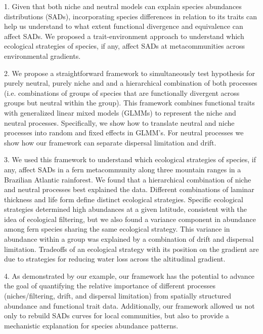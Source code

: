 \documentclass[12pt]{article}
\begin{document}

1. Given that both niche and neutral models can explain species abundances distributions (SADs), incorporating species differences in relation to its traits can help us understand to what extent functional divergence and equivalence can affect SADs. We proposed a trait-environment approach to understand which ecological strategies of species, if any, affect SADs at metacommunities across environmental gradients. 

2. We propose a straightforward framework to simultaneously test hypothesis for purely neutral, purely niche and and a hierarchical combination of both processes (i.e. combinations of groups of species that are functionally divergent across groups but neutral within the group). This framework combines functional traits with generalized linear mixed models (GLMMs) to represent the niche and neutral processes. Specifically, we show how to translate neutral and niche processes into random and fixed effects in GLMM's. For neutral processes we show how our framework can separate dispersal limitation and drift.

3. We used this framework to understand which ecological strategies of species, if any, affect SADs in a fern metacommunity along three mountain ranges in a Brazilian Atlantic rainforest. We found that a hierarchical combination of niche and neutral processes best explained the data. Different combinations of laminar thickness and life form define distinct ecological strategies. Specific ecological strategies determined high abundances at a given latitude, consistent with the idea of ecological filtering, but we also found a variance component in abundance among fern species sharing the same ecological strategy. This variance in abundance within a group was explained by a combination of drift and dispersal limitation. Tradeoffs of an ecological strategy with its position on the gradient are due to strategies for reducing water loss across the altitudinal gradient.

4. As demonstrated by our example, our framework has the potential to advance the goal of quantifying the relative importance of different processes (niches/filtering, drift, and dispersal limitation) from spatially structured abundance and functional trait data. Additionally, our framework allowed us not only to rebuild SADs curves for local communities, but also to provide a mechanistic explanation for species abundance patterns. 

\end{document}
